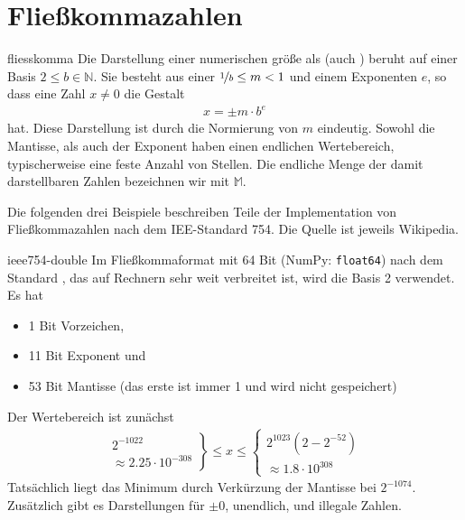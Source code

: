 \section{Fließkommazahlen}

\begin{Definition}{fliesskomma}
  Die Darstellung einer numerischen größe als 
  (auch ) beruht auf einer Basis $2 \le b \in \mathbb N$. Sie
  besteht aus einer  $\nicefrac1b \le m < 1$ und einem
  Exponenten $e$, so dass eine Zahl $x\neq 0$ die Gestalt
  \begin{gather}
    x=\pm m \cdot b^{e}
  \end{gather}
  hat. Diese Darstellung ist durch die Normierung von $m$
  eindeutig. Sowohl die Mantisse, als auch der Exponent haben einen
  endlichen Wertebereich, typischerweise eine feste Anzahl von
  Stellen. Die endliche Menge der damit darstellbaren Zahlen
  bezeichnen wir mit $\mathbb M$.
\end{Definition}

\begin{intro}
  Die folgenden drei Beispiele beschreiben Teile der Implementation
  von Fließkommazahlen nach dem IEE-Standard 754. Die Quelle ist
  jeweils Wikipedia.
\end{intro}
\begin{Beispiel}{ieee754-double}
  Im Fließkommaformat mit 64 Bit (NumPy: \texttt{float64}) nach dem Standard
  , das auf Rechnern sehr weit verbreitet ist, wird
  die Basis 2 verwendet. Es hat
  \begin{itemize}
  \item 1 Bit Vorzeichen,
  \item 11 Bit Exponent und
  \item 53 Bit Mantisse (das erste ist immer 1 und wird nicht gespeichert)
  \end{itemize}
  Der Wertebereich ist zunächst
  \begin{gather}
    \left.
      \begin{matrix}
        2^{-1022} \\ \approx 2.25 \cdot 10^{-308}
      \end{matrix}
    \right\}
    \le x \le
    \left\{
      \begin{matrix}
        2^{1023}(2-2^{-52}) \\
        \approx 1.8 \cdot 10^{308}
      \end{matrix}
    \right.
  \end{gather}
  Tatsächlich liegt das Minimum durch Verkürzung der Mantisse bei
  $2^{-1074}$. Zusätzlich gibt es Darstellungen für $\pm 0$,
  unendlich, und illegale Zahlen.
\end{Beispiel}

